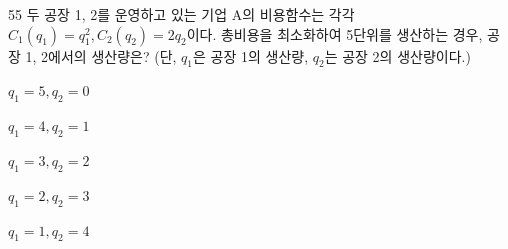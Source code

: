 \begin{question}{55}
두 공장 1, 2를 운영하고 있는 기업 A의 비용함수는 각각 ${ C_{ 1 } (q_{ 1 } )=q_{ 1 }^{ 2 } , C_{ 2 } (q_{ 2 } )=2q_{ 2 } }$이다. 총비용을 최소화하여 5단위를 생산하는 경우, 공장 1, 2에서의 생산량은? (단, ${ q_{ 1 } }$은 공장 1의 생산량, ${ q_{ 2 } }$는 공장 2의 생산량이다.)
\begin{choices}
  \item $q_{ 1 } =5, q_{ 2 } =0$
  \item $q_{ 1 } =4, q_{ 2 } =1$
  \item $q_{ 1 } =3, q_{ 2 } =2$
  \item $q_{ 1 } =2, q_{ 2 } =3$
  \item $q_{ 1 } =1, q_{ 2 } =4$
\end{choices}
\end{question}

